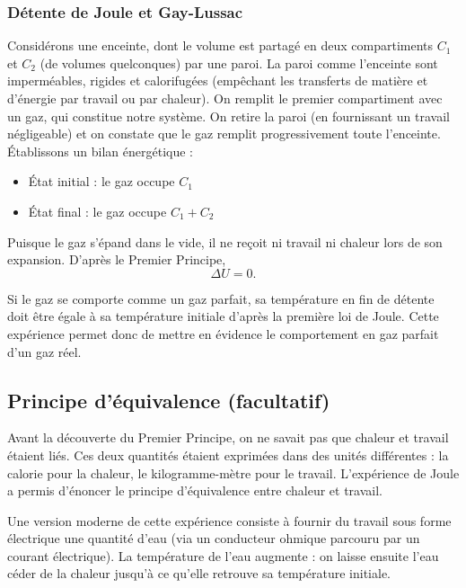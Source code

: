 \documentclass[11pt,a4paper]{report}
\begin{document}
\subsubsection{Détente de Joule et Gay-Lussac}

Considérons une enceinte, dont le volume est partagé en deux compartiments $C_1$ et $C_2$ (de volumes quelconques) par une paroi. La paroi comme l'enceinte sont imperméables, rigides et calorifugées (empêchant les transferts de matière et d'énergie par travail ou par chaleur). On remplit le premier compartiment avec un gaz, qui constitue notre système. On retire la paroi (en fournissant un travail négligeable) et on constate que le gaz remplit progressivement toute l'enceinte.\\

\'Etablissons un bilan énergétique :
\begin{itemize}
	\item \'Etat initial : le gaz occupe $C_1$
	\item \'Etat final : le gaz occupe $C_1 + C_2$
\end{itemize}

Puisque le gaz s'épand dans le vide, il ne reçoit ni travail ni chaleur lors de son expansion. D'après le Premier Principe,
\begin{equation}
	\Delta U = 0.
\end{equation}

Si le gaz se comporte comme un gaz parfait, sa température en fin de détente doit être égale à sa température initiale d'après la première loi de Joule. Cette expérience permet donc de mettre en évidence le comportement en gaz parfait d'un gaz réel. 

\subsection{Principe d'équivalence (facultatif)}

Avant la découverte du Premier Principe, on ne savait pas que chaleur et travail étaient liés. Ces deux quantités étaient exprimées dans des unités différentes : la calorie pour la chaleur, le kilogramme-mètre pour le travail. L'expérience de Joule a permis d'énoncer le principe d'équivalence entre chaleur et travail.

Une version moderne de cette expérience consiste à fournir du travail sous forme électrique une quantité d'eau (via un conducteur ohmique parcouru par un courant électrique). La température de l'eau augmente : on laisse ensuite l'eau céder de la chaleur jusqu'à ce qu'elle retrouve sa température initiale. 
\end{document}
